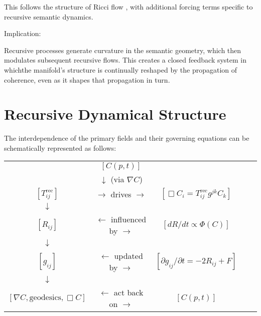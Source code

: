 This follows the structure of Ricci flow \autocite{Hamilton1982, Perelman2002}, with additional forcing terms specific to recursive semantic dynamics.

Implication:

Recursive processes generate curvature in the semantic geometry, which then modulates subsequent recursive flows. This creates a closed feedback system in whichthe manifold's structure is continually reshaped by the propagation of coherence, even as it shapes that propagation in turn.

\section{Recursive Dynamical Structure}

The interdependence of the primary fields and their governing equations can be schematically represented as follows:

\begin{center}
\begin{tabular}{c c c c c}
    & $[ C(p,t) ]$ & & & \\
    & $\downarrow$ (via $\nabla C$) & & & \\
    $[ T^{\text{rec}}_{ij} ]$ & $\rightarrow$ drives $\rightarrow$ & $[ \Box C_i = T^{\text{rec}}_{ij} g^{jk} C_k ]$ & & \\
    $\downarrow$ & & & & \\
    $[ R_{ij} ]$ & $\leftarrow$ influenced by $\rightarrow$ & $[ dR/dt \propto \Phi(C) ]$ & & \\
    $\downarrow$ & & & & \\
    $[ g_{ij} ]$ & $\leftarrow$ updated by $\rightarrow$ & $[ \partial g_{ij}/\partial t = -2R_{ij} + F ]$ & & \\
    $\downarrow$ & & & & \\
    $[ \nabla C, \text{geodesics}, \Box C ]$ & $\leftarrow$ act back on $\rightarrow$ & $[ C(p,t) ]$ & & \\
\end{tabular}
\end{center} 
